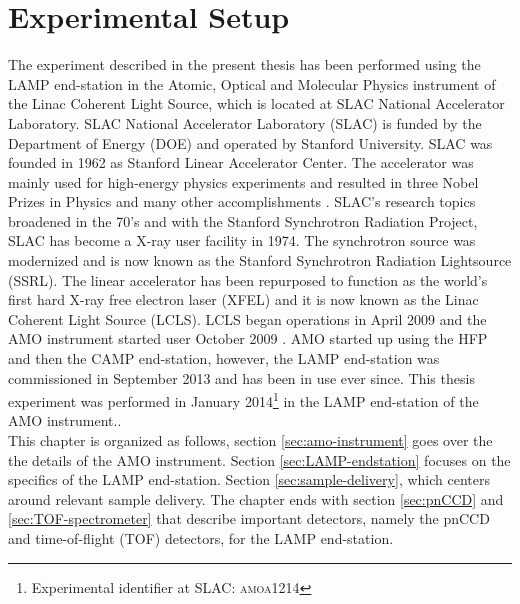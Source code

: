 \chapter{Experimental Setup}\label{ch:exp_setup}
The experiment described in the present thesis has been performed using the LAMP end-station in the Atomic, Optical and Molecular Physics instrument of the Linac Coherent Light Source, which is located at SLAC National Accelerator Laboratory. SLAC National Accelerator Laboratory (SLAC) is funded by the Department of Energy (DOE) and operated by Stanford University. SLAC was founded in 1962 as Stanford Linear Accelerator Center. The accelerator was mainly used for high-energy physics experiments and resulted in three Nobel Prizes in Physics \citep{Richter-PRL-1974,Taylor-SLAC-1967,Perl-PRL-1975} and many other accomplishments \citep{KELLEHER-1990-cell,Emma-2010-NatPho}. SLAC's research topics broadened in the 70's and with the Stanford Synchrotron Radiation Project, SLAC has become a X-ray user facility in 1974. The synchrotron source was modernized and is now known as the Stanford Synchrotron Radiation Lightsource (SSRL). The linear accelerator has been repurposed to function as the world's first hard X-ray free electron laser (XFEL) and it is now known as the Linac Coherent Light Source (LCLS). LCLS began operations in April 2009 \citep{Emma-2010-NatPho} and the AMO instrument started user October 2009 \citep{Bostedt-2013-JPB}. AMO started up using the HFP and then the CAMP end-station, however, the LAMP end-station was commissioned in September 2013 and has been in use ever since. This thesis experiment was performed in January 2014\footnote{Experimental identifier at SLAC: \textsc{amoa1214}} in the LAMP end-station of the AMO instrument..\\
This chapter is organized as follows, section \ref{sec:amo-instrument} goes over the the details of the AMO instrument. Section \ref{sec:LAMP-endstation} focuses on the specifics of the LAMP end-station. Section \ref{sec:sample-delivery}, which centers around relevant sample delivery. The chapter ends with section \ref{sec:pnCCD} and \ref{sec:TOF-spectrometer} that describe important detectors, namely the pnCCD and time-of-flight (TOF) detectors, for the LAMP end-station.
%
%
%

